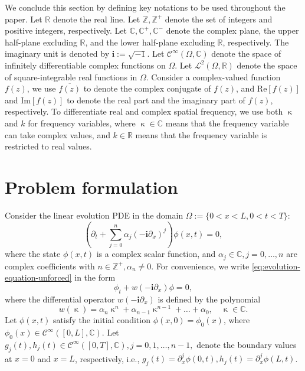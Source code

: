 \documentclass[journal,twoside,web]{ieeecolor}
\newcommand{\ZZ}{\mathbb{Z}}
\newcommand{\RR}{\mathbb{R}}
\newcommand{\CC}{\mathbb{C}}
\newcommand{\state}{\phi}
\newcommand{\im}{\mathbf{i}}
\newcommand{\kcomplex}{\upkappa}
\begin{document}
We conclude this section by defining key notations to be used throughout the paper. 
Let $\RR$ denote the real line. Let $\ZZ,\ZZ^+$ denote the set of integers and positive integers, respectively.
Let $\CC,\CC^+,\CC^-$ denote the complex plane, the upper half-plane excluding $\RR$, and the lower half-plane excluding $\RR$, respectively.
The imaginary unit is denoted by $\im := \sqrt{-1}$.
Let $\mathcal{C}^\infty(\Omega,\CC)$ denote the space of infinitely differentiable complex functions on $\Omega$.
Let $\mathcal{L}^2(\Omega,\RR)$ denote the space of square-integrable real functions in $\Omega$.
Consider a complex-valued function $f(z)$, we use $\overline{f(z)}$ to denote the complex conjugate of $f(z)$, and $\text{Re}[f(z)]$ and $\text{Im}[f(z)]$ to denote the real part and the imaginary part of $f(z)$, respectively.
To differentiate real and complex spatial frequency, we use both $\kcomplex$ and $k$ for frequency variables, where $\kcomplex\in\CC$ means that the frequency variable can take complex values, and $k\in\RR$ means that the frequency variable is restricted to real values.

\section{Problem formulation}\label{sec:problem-formulation}
Consider the linear evolution PDE in the domain $\Omega:=\{0<x<L,0<t<T\}$:
\begin{equation}\label{eq:evolution-equation-unforced}
	\left(\partial_t + \sum_{j=0}^{n}\alpha_j(-\im \partial_x)^j\right)\state(x,t) = 0, 
\end{equation}
where the state $\state(x,t)$ is a complex scalar function, and $\alpha_j\in\CC, j=0,\ldots,n$ are complex coefficients with $n\in\ZZ^+,\alpha_n\neq0$. 
For convenience, we write \eqref{eq:evolution-equation-unforced} in the form
\begin{equation*}
	\state_t + w(-\im\partial_x)\state = 0,
\end{equation*}
where the differential operator $w(-\im\partial_x)$ is defined by the polynomial
	\begin{equation*}
		w(\kcomplex)=\alpha_n \kcomplex^n + \alpha_{n-1}\kcomplex^{n-1} + \ldots + \alpha_0,\quad\kcomplex\in\CC.
	\end{equation*}
Let $\state(x,t)$ satisfy the initial condition $\state(x,0)=\state_0(x)$, where $\state_0(x)\in\mathcal{C}^{\infty}([0,L],\CC)$.
Let $g_j(t),h_j(t)\in\mathcal{C}^\infty([0,T],\CC),j=0,1,\ldots,n-1,$ denote the boundary values at $x=0$ and $x=L$, respectively, i.e., $g_j(t)=\partial_x^j\state(0,t),h_j(t)=\partial_x^j\state(L,t)$.
\end{document}
